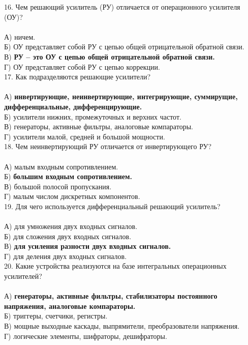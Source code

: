 16. Чем решающий усилитель (РУ) отличается от операционного усилителя (ОУ)?\\\\
А) ничем.\\
Б) ОУ представляет собой РУ с цепью общей отрицательной обратной связи. \\
В) \textbf{РУ – это ОУ с цепью общей отрицательной обратной связи.}\\
Г) ОУ представляет собой РУ с цепью коррекции.\\

17. Как подразделяются решающие усилители?\\\\
А) \textbf{инвертирующие, неинвертирующие, интегрирующие, суммирущие, дифференциальные, дифференцирующие.}\\
Б) усилители нижних, промежуточных и верхних частот.\\
В) генераторы, активные фильтры, аналоговые компараторы.\\
Г) усилители малой, средней и большой мощности.\\

18. Чем неинвертирующий РУ отличается от инвертирующего РУ?\\\\
А) малым входным сопротивлением.\\
Б) \textbf{большим входным сопротивлением.}\\
В) большой полосой пропускания.\\
Г) малым числом дискретных компонентов.\\

19. Для чего используется дифференциальный решающий усилитель?\\\\
А) для умножения двух входных сигналов.\\
Б) для сложения двух входных сигналов.\\
В) \textbf{для усиления разности двух входных сигналов.}\\
Г) для деления двух входных сигналов.\\

20. Какие устройства реализуются на базе интегральных операционных усилителей?\\\\
А) \textbf{генераторы, активные фильтры, стабилизаторы постоянного напряжения, аналоговые компараторы.}\\
Б) триггеры, счетчики, регистры.\\
В) мощные выходные каскады, выпрямители, преобразователи напряжения.\\
Г) логические элементы, шифраторы, дешифраторы.\\

